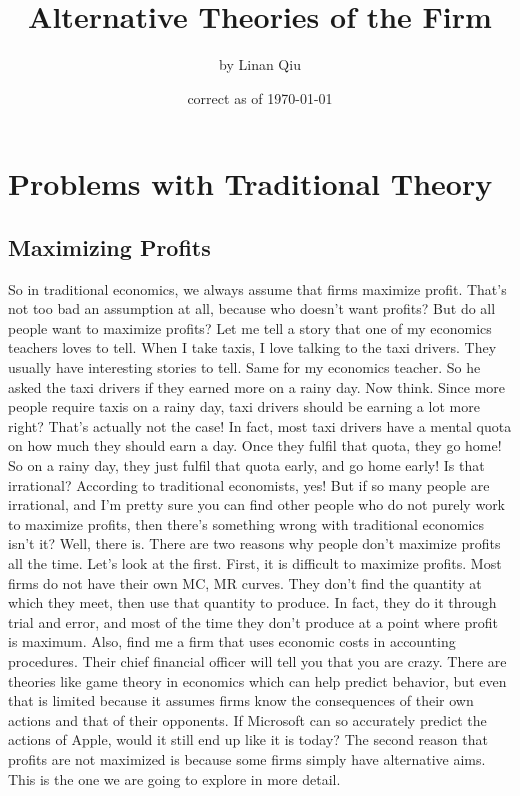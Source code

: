 \documentclass[DIV=calc,11pt,parskip,numbers=noenddot]{scrartcl} %
\title{Alternative Theories of the Firm}
\author{\large by Linan Qiu}
\date{\small correct as of \today}
\begin{document}
\maketitle
\tableofcontents
\section{Problems with Traditional Theory}
\subsection{Maximizing Profits}
So in traditional economics, we always assume that firms maximize profit. That’s not too bad an assumption at all, because who doesn’t want profits? But do all people want to maximize profits? Let me tell a story that one of my economics teachers loves to tell. When I take taxis, I love talking to the taxi drivers. They usually have interesting stories to tell. Same for my economics teacher. So he asked the taxi drivers if they earned more on a rainy day. Now think. Since more people require taxis on a rainy day, taxi drivers should be earning a lot more right? That’s actually not the case! In fact, most taxi drivers have a mental quota on how much they should earn a day. Once they fulfil that quota, they go home! So on a rainy day, they just fulfil that quota early, and go home early! Is that irrational? According to traditional economists, yes! But if so many people are irrational, and I’m pretty sure you can find other people who do not purely work to maximize profits, then there’s something wrong with traditional economics isn’t it? Well, there is. There are two reasons why people don’t maximize profits all the time. Let’s look at the first. First, it is difficult to maximize profits. Most firms do not have their own MC, MR curves. They don’t find the quantity at which they meet, then use that quantity to produce. In fact, they do it through trial and error, and most of the time they don’t produce at a point where profit is maximum. Also, find me a firm that uses economic costs in accounting procedures. Their chief financial officer will tell you that you are crazy. There are theories like game theory in economics which can help predict behavior, but even that is limited because it assumes firms know the consequences of their own actions and that of their opponents. If Microsoft can so accurately predict the actions of Apple, would it still end up like it is today? The second reason that profits are not maximized is because some firms simply have alternative aims. This is the one we are going to explore in more detail.
\end{document}
